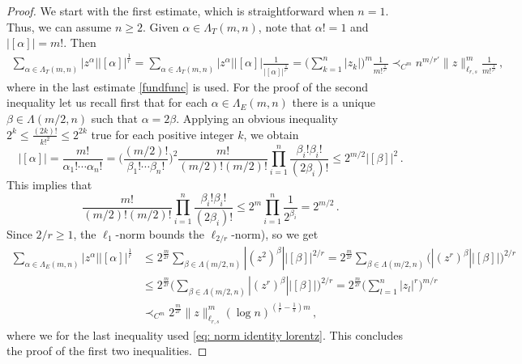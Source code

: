 \documentclass[12pt]{amsart}
\numberwithin{subsection}{section}
\theoremstyle{definition}
\theoremstyle{remark}
\newcommand{\dis}{\displaystyle}
\begin{document}
\begin{proof}
We start with the first estimate, which is straightforward when $n=1$. Thus, we can assume $n \geq 2$. Given $\alpha \in \Lambda_T(m,n)$,
note that $\alpha !=1$ and $|[\alpha]|= m!$. Then
\begin{align*}
\sum_{\alpha \in \Lambda_T(m,n)} |z^\alpha| |[\alpha]|^{\frac{1}{r}}
= \sum_{\alpha \in \Lambda_T(m,n)} | z^\alpha| |[\alpha]| \frac{1}{|[\alpha]|^{\frac{1}{r'}}}
= \Big( \sum_{k=1}^n |z_k| \Big)^{m} \frac{1}{m!^{\frac{1}{r'}}}
\prec_{C^m} n^{m/r'} \| z \|_{\ell_{r,s}}^m \frac{1}{m!^{\frac{1}{r'}}}\,,
\end{align*}
where in the last estimate \eqref{fundfunc} is used. For the proof of the second inequality let us recall first that
for each $\alpha \in \Lambda_E(m,n)$ there is a unique $\beta \in {\Lambda}(m/2,n)$
such that $\alpha = 2 \beta$. Applying an obvious inequality $2^k \le \frac{(2k)!}{k!^2} \le 2^{2k}$ true for each positive integer
$k$, we obtain
\[
|[\alpha]| = \frac{m!}{\alpha_1 ! \cdots \alpha_n!} = \Big(\frac{(m/2)!}{\beta_1 ! \cdots \beta_n!}\Big)^2 \frac{m!}{(m/2)!(m/2)!} \prod_{i=1}^n \frac{\beta_i! \beta_i!}{(2\beta_i)!} \le 2^{m/2}|[\beta]|^2\,.
\]
This implies that
\[
\frac{m!}{(m/2)!(m/2)!} \prod_{i=1}^n \frac{\beta_i! \beta_i!}{(2\beta_i)!} \le 2^m \prod_{i=1}^n \frac{1}{2^{\beta_i}} = 2^{m/2}\,.
\]
Since $2/r \ge 1$, the $\ell_1$-norm bounds the $\ell_{2/r}$-norm), so we get
\begin{align*}
\sum_{\alpha \in \Lambda_E(m,n)} |z^\alpha| |[\alpha]|^{\frac{1}{r}}
&
\le \dis 2^{\frac{m}{2r}}\sum_{\beta \in {\Lambda}(m/2,n)} |(z^2)^\beta| |[\beta]|^{2/r}
= 2^{\frac{m}{2r}} \dis\sum_{\beta \in {\Lambda}(m/2,n)} \Big( |(z^r)^\beta| |[\beta]| \Big)^{2/r}
\\&
\le 2^{\frac{m}{2r}}\Big( \dis\sum_{\beta \in {\Lambda}(m/2,n)} |(z^r)^\beta| |[\beta]| \Big)^{2/r}
=  2^{\frac{m}{2r}}\Big( \sum_{l=1}^n |z_l|^r \Big)^{m/r}
\\&
\prec_{C^m} 2^{\frac{m}{2r}}\|z\|_{\ell_{r,s}}^m (\log n)^{(\frac{1}{r}-\frac{1}{s})m}\,,
\end{align*}
where we for the last inequality used \eqref{eq: norm identity lorentz}. This concludes the proof of the first two inequalities.


\end{proof}
\end{document}
